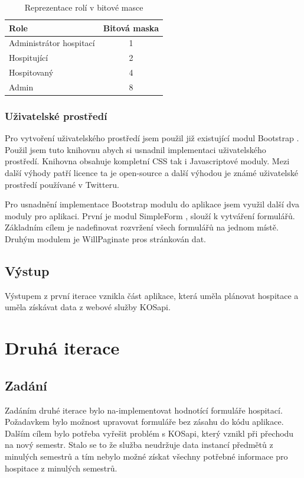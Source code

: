 \begin{table}[h]
\begin{center}
\begin{tabular}{|l|c|}

\hline
\textbf{Role} & \textbf{Bitová maska} \\ \hline
Administrátor hospitací & 1 \\
Hospitující & 2 \\ 
Hospitovaný & 4 \\
Admin & 8 \\\hline

\end{tabular}
\caption{Reprezentace rolí v bitové masce}
\label{tab:role}
\end{center}
\end{table}

\subsubsection{Uživatelské prostředí}
Pro vytvoření uživatelského prostředí jsem použil již existující modul Bootstrap \cite{bootstrap}. Použil jsem tuto knihovnu abych si usnadnil implementaci uživatelského prostředí. Knihovna obsahuje kompletní CSS tak i Javascriptové moduly. Mezi další výhody patří licence ta je open-source a další výhodou je známé uživatelské prostředí používané v Twitteru.

Pro usnadnění implementace Bootstrap modulu do aplikace jsem využil další dva moduly pro aplikaci. První je modul SimpleForm \cite{simpleform}, slouží k vytváření formulářů. Základním cílem je nadefinovat rozvržení všech formulářů na jednom místě. Druhým modulem je WillPaginate \cite{willpaginate} pros stránkován dat.

\subsection{Výstup} 
Výstupem z první iterace vznikla část aplikace, která uměla plánovat hospitace a uměla získávat data z webové služby KOSapi.


\section{Druhá iterace}
\subsection{Zadání}
Zadáním druhé iterace bylo na-implementovat hodnotící formuláře hospitací. Požadavkem bylo možnost upravovat formuláře bez zásahu do kódu aplikace. Dalším cílem bylo potřeba vyřešit problém s KOSapi, který vznikl při přechodu na nový semestr. Stalo se to že služba neudržuje data instancí předmětů z minulých semestrů a tím nebylo možné získat všechny potřebné informace pro hospitace z minulých semestrů.

